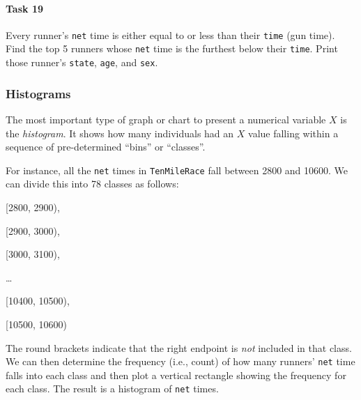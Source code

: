 \documentclass[
]{article}
\newenvironment{Shaded}{\begin{snugshade}}{\end{snugshade}}
\newcommand{\AttributeTok}[1]{\textcolor[rgb]{0.13,0.29,0.53}{#1}}
\newcommand{\ConstantTok}[1]{\textcolor[rgb]{0.56,0.35,0.01}{#1}}
\newcommand{\DecValTok}[1]{\textcolor[rgb]{0.00,0.00,0.81}{#1}}
\newcommand{\FunctionTok}[1]{\textcolor[rgb]{0.13,0.29,0.53}{\textbf{#1}}}
\newcommand{\NormalTok}[1]{#1}
\newcommand{\SpecialCharTok}[1]{\textcolor[rgb]{0.81,0.36,0.00}{\textbf{#1}}}
\newcommand{\StringTok}[1]{\textcolor[rgb]{0.31,0.60,0.02}{#1}}
\begin{document}
\paragraph{Task 19}\label{task-19}

Every runner's \texttt{net} time is either equal to or less than their
\texttt{time} (gun time). Find the top 5 runners whose \texttt{net} time
is the furthest below their \texttt{time}. Print those runner's
\texttt{state}, \texttt{age}, and \texttt{sex}.

\subsubsection{Histograms}\label{histograms}

The most important type of graph or chart to present a numerical
variable \(X\) is the \emph{histogram}. It shows how many individuals
had an \(X\) value falling within a sequence of pre-determined ``bins''
or ``classes''.

For instance, all the \texttt{net} times in \texttt{TenMileRace} fall
between 2800 and 10600. We can divide this into 78 classes as follows:

{[}2800, 2900),

{[}2900, 3000),

{[}3000, 3100),

\ldots{}

{[}10400, 10500),

{[}10500, 10600)

The round brackets indicate that the right endpoint is \emph{not}
included in that class. We can then determine the frequency (i.e.,
count) of how many runners' \texttt{net} time falls into each class and
then plot a vertical rectangle showing the frequency for each class. The
result is a histogram of \texttt{net} times.

\begin{Shaded}
\end{Shaded}
\end{document}
